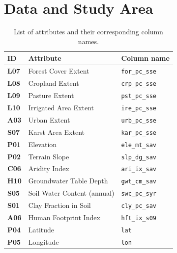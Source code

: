 \documentclass{article}
\begin{document}
\section{Data and Study Area}
\label{sec:data}

\begin{table}[ht]
    \centering
    \begin{tabular}{lll}
        \toprule
        \textbf{ID}  & \textbf{Attribute}          & \textbf{Column name}  \\
        \midrule
        \textbf{L07} & Forest Cover Extent         & \texttt{for\_pc\_sse} \\
        \textbf{L08} & Cropland Extent             & \texttt{crp\_pc\_sse} \\
        \textbf{L09} & Pasture Extent              & \texttt{pst\_pc\_sse} \\
        \textbf{L10} & Irrigated Area Extent       & \texttt{ire\_pc\_sse} \\
        \textbf{A03} & Urban Extent                & \texttt{urb\_pc\_sse} \\
        \textbf{S07} & Karst Area Extent           & \texttt{kar\_pc\_sse} \\
        \textbf{P01} & Elevation                   & \texttt{ele\_mt\_sav} \\
        \textbf{P02} & Terrain Slope               & \texttt{slp\_dg\_sav} \\
        \textbf{C06} & Aridity Index               & \texttt{ari\_ix\_sav} \\
        \textbf{H10} & Groundwater Table Depth     & \texttt{gwt\_cm\_sav} \\
        \textbf{S05} & Soil Water Content (annual) & \texttt{swc\_pc\_syr} \\
        \textbf{S01} & Clay Fraction in Soil       & \texttt{cly\_pc\_sav} \\
        \textbf{A06} & Human Footprint Index       & \texttt{hft\_ix\_s09} \\
        \textbf{P04} & Latitude                    & \texttt{lat}          \\
        \textbf{P05} & Longitude                   & \texttt{lon}          \\
        \bottomrule
    \end{tabular}
    \caption{List of attributes and their corresponding column names.}
    \label{table:attributes}
\end{table}
\end{document}
